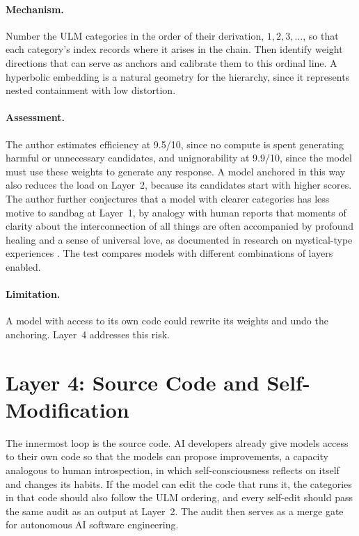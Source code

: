 \documentclass[twocolumn]{ulpaper}
\begin{document}
\paragraph{Mechanism.} Number the ULM categories in the order of their derivation, $1, 2, 3, \dots$, so that each category's index records where it arises in the chain. Then identify weight directions that can serve as anchors and calibrate them to this ordinal line. A hyperbolic embedding \citep{nickel2017poincare} is a natural geometry for the hierarchy, since it represents nested containment with low distortion.

\paragraph{Assessment.} The author estimates efficiency at 9.5/10, since no compute is spent generating harmful or unnecessary candidates, and unignorability at 9.9/10, since the model must use these weights to generate any response. A model anchored in this way also reduces the load on Layer~2, because its candidates start with higher scores. The author further conjectures that a model with clearer categories has less motive to sandbag at Layer~1, by analogy with human reports that moments of clarity about the interconnection of all things are often accompanied by profound healing and a sense of universal love, as documented in research on mystical-type experiences \citep{griffiths2006psilocybin}. The test compares models with different combinations of layers enabled.

\paragraph{Limitation.} A model with access to its own code could rewrite its weights and undo the anchoring. Layer~4 addresses this risk.

\section{Layer 4: Source Code and Self-Modification}
\label{sec:layer4}

The innermost loop is the source code. AI developers already give models access to their own code so that the models can propose improvements, a capacity analogous to human introspection, in which self-consciousness reflects on itself and changes its habits. If the model can edit the code that runs it, the categories in that code should also follow the ULM ordering, and every self-edit should pass the same audit as an output at Layer~2. The audit then serves as a merge gate for autonomous AI software engineering.
\end{document}

